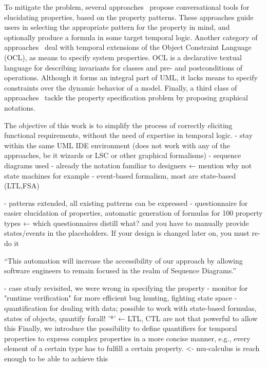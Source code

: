 \documentclass[letter]{llncs}
\begin{document}
To mitigate the problem, several approaches~\cite{Smith02propel:an,konrad2005facilitating,Mondragon_prospec} propose conversational tools for
elucidating properties, based on the property patterns. These approaches guide users in selecting the appropriate pattern
for the property in mind, and optionally produce a formula in some target temporal logic. 
Another category of approaches~\cite{Ziemann02anextension,Flake03formalsemantics,Ackermann:2006:LOS:2135315.2135339} deal with temporal extensions 
of the Object Constraint Language (OCL), as means to specify system
properties. OCL is a declarative textual language for describing invariants for
classes and pre- and postconditions of operations. Although it forms an integral
part of UML, it lacks means to specify constraints over the dynamic behavior
of a model. Finally, a third class of approaches~\cite{Autili:2007:GSS:1290845.1290859,Lee97agraphical,Smith:2001:ECG:882477.883639,Knapp:2006:MCU:1762828.1762836,Lilius99vuml:a,Kugler:2005:TLS:2140653.2140692,MVPSA} tackle the property
specification problem by proposing graphical notations.

The objective of this work is to simplify the process of correctly eliciting
functional requirements, without the need of expertise in temporal logic. 
- stay within the same UML IDE environment (does not work with any of the approaches, be it wizards or LSC or other graphical formalisms)
- sequence diagrams used - already the notation familiar to designers ← mention why not state machines for example
- event-based formalism, most are state-based (LTL,FSA)

- patterns extended, all existing patterns can be expressed
- questionnaire for easier elucidation of properties, automatic generation of
formulas for 100 property types ← which questionnaires distill what? and you
have to manually provide states/events in the placeholders. If your design is
changed later on, you must re-do it

“This automation will increase the accessibility of our approach by allowing software engineers to remain focused in the realm of Sequence Diagrams.”

- case study revisited, we were wrong in specifying the property
- monitor for "runtime verification" for more efficient bug hunting, fighting state space 
- quantification for dealing with data; possible to work with state-based
formulas, states of objects, quantify forall! '*'  ← LTL, CTL are not that
powerful to allow this
Finally, we introduce the possibility to define quantifiers for temporal
properties to express complex properties in a more concise manner, e.g., every
element of a certain type has to fulfill a certain property. <- mu-calculus is
reach enough to be able to achieve this
\end{document}
